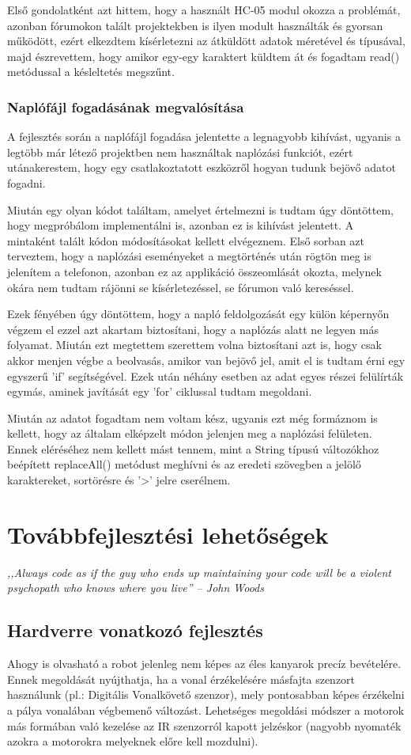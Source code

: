 \documentclass[]{thesis-ekf}
\theoremstyle{definition}
\begin{document}
Első gondolatként azt hittem, hogy a használt HC-05 modul okozza a problémát, azonban fórumokon talált projektekben is ilyen modult használták és gyorsan működött, ezért elkezdtem kísérletezni az átküldött adatok méretével és típusával, majd észrevettem, hogy amikor egy-egy karaktert küldtem át és fogadtam read() metódussal a késleltetés megszűnt.
\subsection{Naplófájl fogadásának megvalósítása}\label{log_fogadás}
A fejlesztés során a naplófájl fogadása jelentette a legnagyobb kihívást, ugyanis a legtöbb már létező projektben nem használtak naplózási funkciót, ezért utánakerestem, hogy egy csatlakoztatott eszközről hogyan tudunk bejövő adatot fogadni\cite{Data_Recieve}.

Miután egy olyan kódot találtam, amelyet értelmezni is tudtam úgy döntöttem, hogy megpróbálom implementálni is, azonban ez is kihívást jelentett. A mintaként talált kódon módosításokat kellett elvégeznem. Első sorban azt terveztem, hogy a naplózási eseményeket a megtörténés után rögtön meg is jelenítem a telefonon, azonban ez az applikáció összeomlását okozta, melynek okára nem tudtam rájönni se kísérletezéssel, se fórumon való kereséssel.

Ezek fényében úgy döntöttem, hogy a napló feldolgozását egy külön képernyőn végzem el ezzel azt akartam biztosítani, hogy a naplózás alatt ne legyen más folyamat. Miután ezt megtettem szerettem volna biztosítani azt is, hogy csak akkor menjen végbe a beolvasás, amikor van bejövő jel, amit el is tudtam érni egy egyszerű 'if' segítségével. Ezek után néhány esetben az adat egyes részei felülírták egymás, aminek javítását egy 'for' ciklussal tudtam megoldani.

Miután az adatot fogadtam nem voltam kész, ugyanis ezt még formáznom is kellett, hogy az általam elképzelt módon jelenjen meg a naplózási felületen. Ennek eléréséhez nem kellett mást tennem, mint a String típusú változókhoz beépített replaceAll() metódust meghívni és az eredeti szövegben a jelölő karaktereket, sortörésre és '>' jelre cserélnem.
\chapter{Továbbfejlesztési lehetőségek}
\emph{,,Always code as if the guy who ends up maintaining your code will be a violent psychopath who knows where you live'' -- John Woods}
\section{Hardverre vonatkozó fejlesztés}
Ahogy  is olvasható a robot jelenleg nem képes az éles kanyarok precíz bevételére. Ennek megoldását nyújthatja, ha a vonal érzékelésére másfajta szenzort használunk (pl.: Digitális Vonalkövető szenzor), mely pontosabban képes érzékelni a pálya vonalában végbemenő változást.
Lehetséges megoldási módszer a motorok más formában való kezelése az IR szenzorról kapott jelzéskor (nagyobb nyomaték azokra a motorokra melyeknek előre kell mozdulni).
\end{document}
